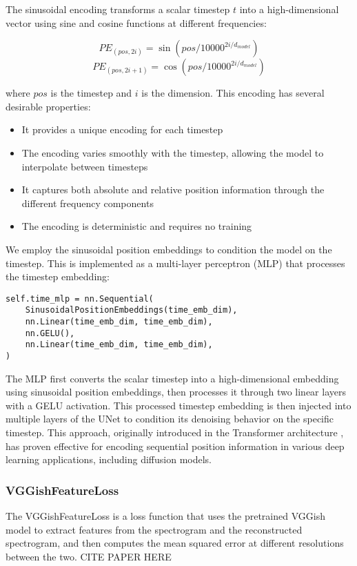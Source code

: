 The sinusoidal encoding transforms a scalar timestep $t$ into a high-dimensional vector using sine and cosine functions at different frequencies:

\begin{equation}
    PE_{(pos,2i)} = \sin(pos/10000^{2i/d_{model}})
\end{equation}
\begin{equation}
    PE_{(pos,2i+1)} = \cos(pos/10000^{2i/d_{model}})
\end{equation}

\noindent where $pos$ is the timestep and $i$ is the dimension. This encoding has several desirable properties:

\begin{itemize}
    \item It provides a unique encoding for each timestep
    \item The encoding varies smoothly with the timestep, allowing the model to interpolate between timesteps
    \item It captures both absolute and relative position information through the different frequency components
    \item The encoding is deterministic and requires no training
\end{itemize}


\noindent We employ the sinusoidal position embeddings to condition the model on the timestep. This is implemented as a multi-layer perceptron (MLP) that processes the timestep embedding:

\begin{lstlisting}[basicstyle=\tiny]
self.time_mlp = nn.Sequential(
    SinusoidalPositionEmbeddings(time_emb_dim),
    nn.Linear(time_emb_dim, time_emb_dim),
    nn.GELU(),
    nn.Linear(time_emb_dim, time_emb_dim),
)
\end{lstlisting}

\noindent The MLP first converts the scalar timestep into a high-dimensional embedding using sinusoidal position embeddings, then processes it through two linear layers with a GELU activation. This processed timestep embedding is then injected into multiple layers of the UNet to condition its denoising behavior on the specific timestep. This approach, originally introduced in the Transformer architecture \cite{vaswani2017attention}, has proven effective for encoding sequential position information in various deep learning applications, including diffusion models.


\subsubsection{VGGishFeatureLoss}
The VGGishFeatureLoss is a loss function that uses the pretrained VGGish model to extract features from the spectrogram and the reconstructed spectrogram, and then computes the mean squared error at different resolutions between the two. CITE PAPER HERE


